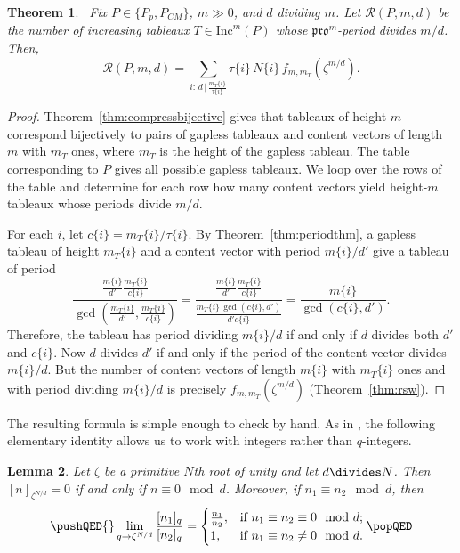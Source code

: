 \documentclass[12pt]{amsart}
\newtheorem{theorem}{Theorem}[section]
\newtheorem{lemma}[theorem]{Lemma}
\theoremstyle{definition}
\theoremstyle{remark}
\numberwithin{equation}{section}
\newcommand{\inc}{\ensuremath{\mathrm{Inc}}}
\newcommand{\pro}{\mathfrak{pro}}
\begin{document}
\begin{theorem}~\label{thm:mainresult}
Fix $P \in \lbrace  P_p, P_{CM} \rbrace$, $m \gg 0$, and $d$ dividing $m$. Let $\mathcal{R}(P,m,d)$ be the number of increasing tableaux $T \in \inc^m(P)$ whose $\pro^m$-period divides $m/d$. Then,
\begin{equation}\label{eq:mainresulteq} 
\mathcal{R}(P,m,d)  = \sum \limits_{i: \, d \, \vert \, \frac{m_T\{i\}}{\tau\{i\}}} \tau\{i\} \, N\{i\} \, f_{m,m_T}(\zeta^{m/d}).
\end{equation}
\end{theorem}
\begin{proof}
Theorem~\ref{thm:compressbijective} gives that tableaux of height $m$ correspond bijectively to pairs of gapless tableaux and content vectors of length $m$ with $m_T$ ones, where $m_T$ is the height of the gapless tableau. The table corresponding to $P$ gives all possible gapless tableaux. We loop over the rows of the table and determine for each row how many content vectors yield height-$m$ tableaux whose periods divide $m/d$. 

For each $i$, let $c\{i\} = m_T\{i\}/\tau\{i\}$. By Theorem~\ref{thm:periodthm}, a gapless tableau of height $m_T\{i\}$ and a content vector with period $m\{i\}/d'$ give a tableau of period \[ \frac{\frac{m\{i\}}{d'} \frac{m_T\{i\}}{c\{i\}}}{\gcd(\frac{m_T\{i\}}{d'},\frac{m_T\{i\}}{c\{i\}})} = \frac{\frac{m\{i\}}{d'} \frac{m_T\{i\}}{c\{i\}}}{\frac{m_T\{i\} \, \gcd(c\{i\},d')}{d' c\{i\}}} = \frac{m\{i\}}{\gcd(c\{i\},d')}. \] 
Therefore, the tableau has period dividing $m\{i\}/d$ if and only if $d$ divides both $d'$ and $c\{i\}$. Now $d$ divides $d'$ if and only if the period of the content vector divides $m\{i\}/d$. But the number of content vectors of length $m\{i\}$ with $m_T\{i\}$ ones and with period dividing $m\{i\}/d$ is precisely $f_{m,m_T}(\zeta^{m/d})$ (Theorem~\ref{thm:rsw}).
\end{proof}

The resulting formula is simple enough to check by hand. As in \cite[Proof of Theorem 7.1]{Reiner.Stanton.White}, the following elementary identity allows us to work with integers rather than $q$-integers. 


\begin{lemma}\label{lem:evalq}
Let $\zeta$ be a primitive $N$th root of unity and let $d \divides N$. Then $[n]_{\zeta^{N/d}} = 0$ if and only if $n \equiv 0 \mod d$. Moreover, if $n_1 \equiv n_2 \mod d$, then 
\begin{equation}\label{eq:evalq}
\pushQED{\qed}
\lim \limits_{q \rightarrow \zeta^{N/d}} \frac{[n_1]_q}{[n_2]_q} = 
\begin{cases}
\frac{n_1}{n_2}, &\text{if }  n_1 \equiv n_2 \equiv 0 \mod d; \\
1, &\text{if } n_1 \equiv n_2 \neq 0 \mod d.
\end{cases} \qedhere \popQED
\end{equation}
\end{lemma}
\end{document}
